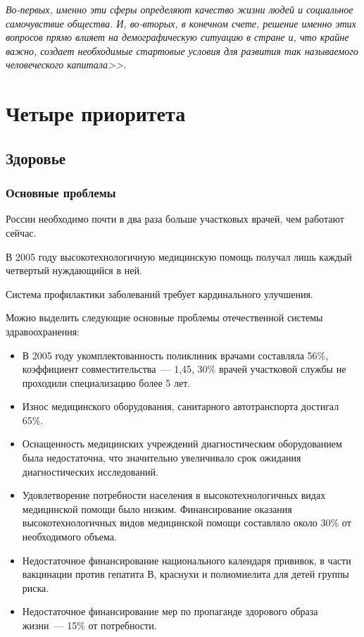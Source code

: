 \documentclass[article, 12pt, russian, oneside]{ncc}
\begin{document}
\emph{Во-первых, именно эти сферы определяют качество жизни людей и
социальное самочувствие общества. И, во-вторых, в конечном счете,
решение именно этих вопросов прямо влияет на демографическую ситуацию
в стране и, что крайне важно, создает необходимые стартовые условия
для развития так называемого человеческого капитала>>.}
\newpage


\section{Четыре приоритета}
\subsection{Здоровье}

\subsubsection{Основные проблемы}

России необходимо почти в два раза больше участковых врачей, чем
работают сейчас.

В 2005 году высокотехнологичную медицинскую помощь получал лишь каждый
четвертый нуждающийся в ней.

Система профилактики заболеваний требует кардинального улучшения.

Можно выделить следующие основные проблемы отечественной системы
здравоохранения:

\begin{itemize}
\item В 2005 году укомплектованность поликлиник врачами составляла
  56\%, коэффициент совместительства~--- 1,45, 30\% врачей участковой
  службы не проходили специализацию более 5 лет.
\item Износ медицинского оборудования, санитарного автотранспорта
  достигал 65\%.
\item Оснащенность медицинских учреждений диагностическим
  оборудованием была недостаточна, что значительно увеличивало срок
  ожидания диагностических исследований.
\item Удовлетворение потребности населения в высокотехнологичных видах
  медицинской помощи было низким. Финансирование оказания
  высокотехнологичных видов медицинской помощи составляло около 30\%
  от необходимого объема.
\item Недостаточное финансирование национального календаря прививок, в
  части вакцинации против гепатита В, краснухи и полиомиелита для
  детей группы риска.
\item Недостаточное финансирование мер по пропаганде здорового образа
  жизни~--- 15\% от потребности.
\end{itemize}
\end{document}
